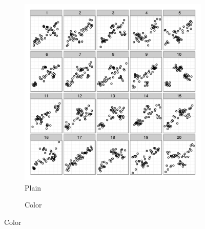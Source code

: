\documentclass[11pt]{isuthesis}\usepackage[]{graphicx}\usepackage[]{color}
\begin{document}
\begin{figure}[ht]
% 

\centering
\begin{subfigure}[t]{0.28\linewidth}
  \caption{Plain}
  \includegraphics[width=\linewidth]{fig-samplepics-1}
\end{subfigure}
\begin{subfigure}[t]{0.28\linewidth}
  \caption{Color}

\end{subfigure}
\end{figure}
\end{document}

